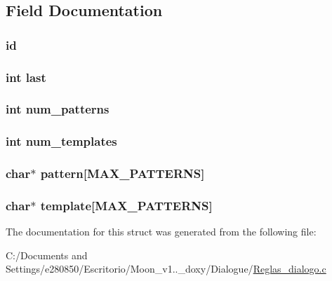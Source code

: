 \subsection{Field Documentation}
\hypertarget{struct___rule_a150a709e86e7134d17cd063de6810b6c}{
\subsubsection[{id}]{ id}}\label{struct___rule_a150a709e86e7134d17cd063de6810b6c}
\hypertarget{struct___rule_a72e27dee31b1c4c6a504fbed29542d97}{
\subsubsection[{last}]{\setlength{\rightskip}{0pt plus 5cm}int last}}\label{struct___rule_a72e27dee31b1c4c6a504fbed29542d97}
\hypertarget{struct___rule_a70421908d9d75967f3e5fb47527a5cef}{
\subsubsection[{num\+\_\+patterns}]{\setlength{\rightskip}{0pt plus 5cm}int num\+\_\+patterns}}\label{struct___rule_a70421908d9d75967f3e5fb47527a5cef}
\hypertarget{struct___rule_abd6968f15e4cadc35682bd9661dbc2c9}{
\subsubsection[{num\+\_\+templates}]{\setlength{\rightskip}{0pt plus 5cm}int num\+\_\+templates}}\label{struct___rule_abd6968f15e4cadc35682bd9661dbc2c9}
\hypertarget{struct___rule_a3d55cafd916ba96e438b8092d299c250}{
\subsubsection[{pattern}]{\setlength{\rightskip}{0pt plus 5cm}char$\ast$ pattern\mbox{[}{\bf M\+A\+X\+\_\+\+P\+A\+T\+T\+E\+R\+N\+S}\mbox{]}}}\label{struct___rule_a3d55cafd916ba96e438b8092d299c250}
\hypertarget{struct___rule_a93415ea39c3f89a4501aa6bf1a1d4c35}{
\subsubsection[{template}]{\setlength{\rightskip}{0pt plus 5cm}char$\ast$ template\mbox{[}{\bf M\+A\+X\+\_\+\+P\+A\+T\+T\+E\+R\+N\+S}\mbox{]}}}\label{struct___rule_a93415ea39c3f89a4501aa6bf1a1d4c35}


The documentation for this struct was generated from the following file\+:\begin{DoxyCompactItemize}
\item 
C\+:/\+Documents and Settings/e280850/\+Escritorio/\+Moon\+\_\+v1..\+\_\+doxy/\+Dialogue/\hyperlink{_reglas__dialogo_8c}{Reglas\+\_\+dialogo.\+c}\end{DoxyCompactItemize}

